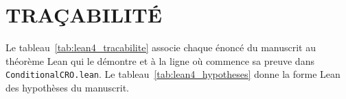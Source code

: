

\section{TRA\c{C}ABILIT\'E}
\label{sec:lean4_tracabilite}

\begin{sloppypar}
Le tableau~\ref{tab:lean4_tracabilite} associe chaque \'enonc\'e du manuscrit au th\'eor\`eme Lean
qui le d\'emontre et \`a la ligne o\`u commence sa preuve dans \texttt{ConditionalCRO.lean}. Le
tableau~\ref{tab:lean4_hypotheses} donne la forme Lean des hypoth\`eses du manuscrit.
\end{sloppypar}

